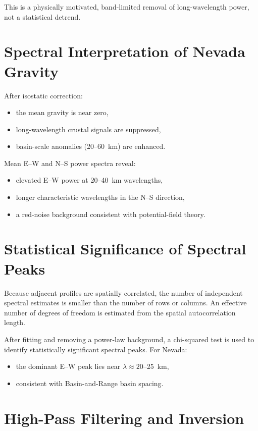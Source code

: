 \documentclass[11pt,a4paper]{article}
\begin{document}
This is a physically motivated, band-limited removal of long-wavelength power,
not a statistical detrend.

\section{Spectral Interpretation of Nevada Gravity}

After isostatic correction:
\begin{itemize}
  \item the mean gravity is near zero,
  \item long-wavelength crustal signals are suppressed,
  \item basin-scale anomalies (20--60~km) are enhanced.
\end{itemize}

Mean E--W and N--S power spectra reveal:
\begin{itemize}
  \item elevated E--W power at 20--40~km wavelengths,
  \item longer characteristic wavelengths in the N--S direction,
  \item a red-noise background consistent with potential-field theory.
\end{itemize}

\section{Statistical Significance of Spectral Peaks}

Because adjacent profiles are spatially correlated,
the number of independent spectral estimates is smaller than the number of rows or columns.
An effective number of degrees of freedom is estimated from the spatial autocorrelation length.

After fitting and removing a power-law background,
a chi-squared test is used to identify statistically significant spectral peaks.
For Nevada:
\begin{itemize}
  \item the dominant E--W peak lies near $\lambda \approx 20$--25~km,
  \item consistent with Basin-and-Range basin spacing.
\end{itemize}

\section{High-Pass Filtering and Inversion}
\end{document}
